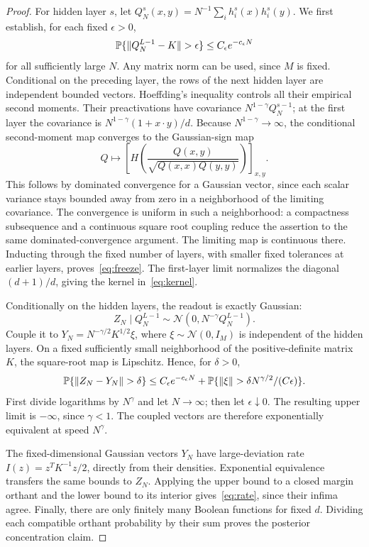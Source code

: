 \documentclass[11pt]{article}
\theoremstyle{remark}\newtheorem{remark}[theorem]{Remark}
\begin{document}
\begin{proof}
For hidden layer $s$, let
$Q_N^s(x,y)=N^{-1}\sum_i h_i^s(x)h_i^s(y)$.
We first establish, for each fixed $\epsilon>0$,
\begin{equation}\label{eq:freeze}
 \Pp\{\|Q_N^{L-1}-K\|>\epsilon\}
       \le C_\epsilon e^{-c_\epsilon N}
\end{equation}
for all sufficiently large $N$. Any matrix norm can be used, since
$M$ is fixed. Conditional on the preceding layer, the rows of the
next hidden layer are independent bounded vectors. Hoeffding's
inequality controls all their empirical second moments. Their
preactivations have covariance $N^{1-\gamma}Q_N^{s-1}$; at the first
layer the covariance is
$N^{1-\gamma}(1+x\cdot y)/d$. Because $N^{1-\gamma}\to\infty$,
the conditional second-moment map converges to the Gaussian-sign map
\[
 Q\longmapsto \left[H\!\left(
 \frac{Q(x,y)}{\sqrt{Q(x,x)Q(y,y)}}\right)\right]_{x,y}.
\]
This follows by dominated convergence for a Gaussian vector, since
each scalar variance stays bounded away from zero in a neighborhood
of the limiting covariance. The convergence is uniform in such a
neighborhood: a compactness subsequence and a continuous square root
coupling reduce the assertion to the same dominated-convergence
argument. The limiting map is continuous there. Inducting through
the fixed number of layers, with smaller fixed tolerances at earlier
layers, proves~\eqref{eq:freeze}. The first-layer limit normalizes
the diagonal $(d+1)/d$, giving the kernel in~\eqref{eq:kernel}.

Conditionally on the hidden layers, the readout is exactly Gaussian:
\begin{equation}\label{eq:readout}
 Z_N\mid Q_N^{L-1}\sim\mathcal N(0,N^{-\gamma}Q_N^{L-1}).
\end{equation}
Couple it to $Y_N=N^{-\gamma/2}K^{1/2}\xi$, where
$\xi\sim\mathcal N(0,I_M)$ is independent of the hidden layers.
On a fixed sufficiently small neighborhood of the positive-definite
matrix $K$, the square-root map is Lipschitz. Hence, for $\delta>0$,
\[
 \Pp\{\|Z_N-Y_N\|>\delta\}
 \le C_\epsilon e^{-c_\epsilon N}
 +\Pp\{\|\xi\|>\delta N^{\gamma/2}/(C\epsilon)\}.
\]
First divide logarithms by $N^\gamma$ and let $N\to\infty$;
then let $\epsilon\downarrow0$. The resulting upper limit is
$-\infty$, since $\gamma<1$. The coupled vectors are therefore
exponentially equivalent at speed $N^\gamma$.

The fixed-dimensional Gaussian vectors $Y_N$ have large-deviation
rate $I(z)=z^TK^{-1}z/2$, directly from their densities. Exponential
equivalence transfers the same bounds to $Z_N$. Applying the upper
bound to a closed margin orthant and the lower bound to its interior
gives~\eqref{eq:rate}, since their infima agree. Finally, there are
only finitely many Boolean functions for fixed $d$. Dividing each
compatible orthant probability by their sum proves the posterior
concentration claim.
\end{proof}
\end{document}
